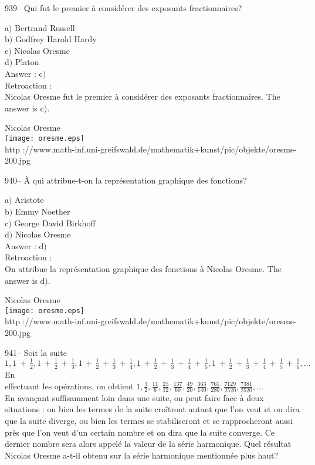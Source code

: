 ﻿\documentclass[letterpaper, 12pt]{article}
\begin{document}
939-- Qui fut le premier \`a consid\'erer des exposants
fractionnaires?

a$)$ Bertrand Russell \\
b$)$ Godfrey Harold Hardy \\
c$)$ Nicolas Oresme \\
d$)$ Platon\\

Answer : c$)$\\

Retroaction : \\
Nicolas Oresme fut le premier \`a consid\'erer des exposants
fractionnaires. The answer is c$)$.\\

        \begin{center}
        Nicolas Oresme\\
    \texttt{[image: oresme.eps]}\\
        {\footnotesize http
://www.math-inf.uni-greifswald.de/mathematik+kunst/pic/objekte/oresme-200.jpg}
    \end{center}

940-- \`A qui attribue-t-on la repr\'esentation graphique des
fonctions?

a$)$ Aristote \\
b$)$ Emmy Noether \\
c$)$ George David Birkhoff \\
d$)$ Nicolas Oresme\\

Answer : d$)$\\

Retroaction : \\
On attribue la repr\'esentation graphique des fonctions \`a Nicolas Oresme.
The answer is d$)$.\\

        \begin{center}
        Nicolas Oresme\\
    \texttt{[image: oresme.eps]}\\
        {\footnotesize http
://www.math-inf.uni-greifswald.de/mathematik+kunst/pic/objekte/oresme-200.jpg}
    \end{center}

941-- Soit la suite
$1,1\,+\,\frac12,1\,+\,\frac12\,+\,\frac13,1\,+\,\frac12\,+\,\frac13\,+\,\frac14,1\,+\,\frac12\,+\,\frac13\,+\,\frac14\,+\,\frac15,
1\,+\,\frac12\,+\,\frac13\,+\,\frac14\,+\,\frac15\,+\,\frac16,\ldots$ En \\
[2mm] effectuant les op\'erations, on obtient
$1,\frac32,\frac{11}6,\frac{25}{12},\frac{137}{60},\frac{49}{20},
\frac{363}{140},\frac{761}{280},\frac{7129}{2520},\frac{7381}{2520},\ldots$
\\ [2mm] En avan\c cant suffisamment loin dans une suite, on peut
faire face \`a deux situations : ou bien les termes de la suite
cro\^itront autant que l'on veut et on dira que la suite diverge, ou
bien les termes se stabiliseront et se rapprocheront aussi pr\`es
que l'on veut d'un certain nombre et on dira que la suite converge.
Ce dernier nombre sera alors appel\'e la valeur de la s\'erie
harmonique. Quel r\'esultat Nicolas Oresme a-t-il obtenu sur la
s\'erie harmonique mentionn\'ee plus haut?
\end{document}
